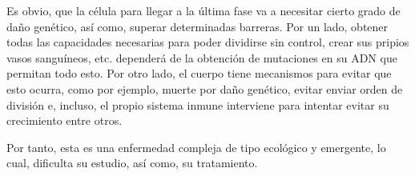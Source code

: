 Es obvio, que la célula para llegar a la última fase va a necesitar cierto grado de daño genético,
así como, superar determinadas barreras. Por un lado, obtener todas las capacidades necesarias para
poder dividirse sin control, crear sus pripios vasos sanguíneos, etc. dependerá de la obtención
de mutaciones en su ADN que permitan todo esto. Por otro lado, el cuerpo tiene mecanismos para evitar
que esto ocurra, como por ejemplo, muerte por daño genético, evitar enviar orden de división e, incluso,
el propio sistema inmune interviene para intentar evitar su crecimiento entre otros.

Por tanto, esta es una enfermedad compleja de tipo ecológico y emergente, lo cual, dificulta su estudio,
así como, su tratamiento.
